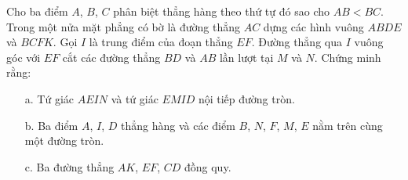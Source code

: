 \begin{ex}%
	Cho ba điểm $ A $, $ B $, $ C $ phân biệt thẳng hàng theo thứ tự đó sao cho $AB<BC $. Trong một nửa mặt phẳng có bờ là đường thẳng $ AC $ dựng các hình vuông $ ABDE $ và $ BCFK $. Gọi $ I $ là trung điểm của đoạn thẳng $ EF $. Đường thẳng qua $ I $ vuông góc với $ EF $ cắt các đường thẳng $ BD $ và $ AB $ lần lượt tại $ M $ và $ N $. Chứng minh rằng:
	\begin{enumerate}
		\item[a.] Tứ giác $ AEIN $ và tứ giác $ EMID $ nội tiếp đường tròn.
		\item[b.] Ba điểm $ A $, $ I $, $ D $ thẳng hàng và các điểm $ B $, $ N $, $ F $, $ M $, $ E $ nằm trên cùng một đường tròn.
		\item[c.] Ba đường thẳng $AK$, $EF$, $CD$ đồng quy.
	\end{enumerate}
\end{ex}
